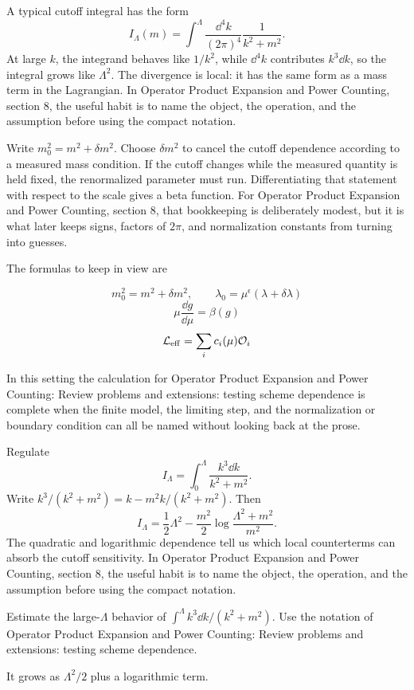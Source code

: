 A typical cutoff integral has the form
\[
  I_\Lambda(m)=\int^{\Lambda}\frac{\dd^4k}{(2\pi)^4}\frac{1}{k^2+m^2}.
\]
At large \(k\), the integrand behaves like \(1/k^2\), while \(\dd^4k\) contributes \(k^3\dd k\), so the integral grows like \(\Lambda^2\).  The divergence is local: it has the same form as a mass term in the Lagrangian.  In Operator Product Expansion and Power Counting, section 8, the useful habit is to name the object, the operation, and the assumption before using the compact notation.

Write \(m_0^2=m^2+\delta m^2\).  Choose \(\delta m^2\) to cancel the cutoff dependence according to a measured mass condition.  If the cutoff changes while the measured quantity is held fixed, the renormalized parameter must run.  Differentiating that statement with respect to the scale gives a beta function.  For Operator Product Expansion and Power Counting, section 8, that bookkeeping is deliberately modest, but it is what later keeps signs, factors of \(2\pi\), and normalization constants from turning into guesses.

The formulas to keep in view are

\[
  m_0^2=m^2+\delta m^2,\qquad \lambda_0=\mu^\epsilon(\lambda+\delta\lambda)
\]
\[
  \mu\frac{\dd g}{\dd\mu}=\beta(g)
\]
\[
  \mathcal L_{\mathrm{eff}}=\sum_i c_i(\mu)\mathcal O_i
\]

In this setting the calculation for Operator Product Expansion and Power Counting: Review problems and extensions: testing scheme dependence is complete when the finite model, the limiting step, and the normalization or boundary condition can all be named without looking back at the prose.




\begin{example}
Regulate
\[
  I_\Lambda=\int_0^\Lambda\frac{k^3\dd k}{k^2+m^2}.
\]
Write \(k^3/(k^2+m^2)=k-m^2k/(k^2+m^2)\).  Then
\[
  I_\Lambda=\frac12\Lambda^2-\frac{m^2}{2}\log\frac{\Lambda^2+m^2}{m^2}.
\]
The quadratic and logarithmic dependence tell us which local counterterms can absorb the cutoff sensitivity.  In Operator Product Expansion and Power Counting, section 8, the useful habit is to name the object, the operation, and the assumption before using the compact notation.
\end{example}



\begin{exercise}
Estimate the large-\(\Lambda\) behavior of \(\int^\Lambda k^3\dd k/(k^2+m^2)\).  Use the notation of Operator Product Expansion and Power Counting: Review problems and extensions: testing scheme dependence.
\begin{answer}
It grows as \(\Lambda^2/2\) plus a logarithmic term.
\end{answer}
\end{exercise}

